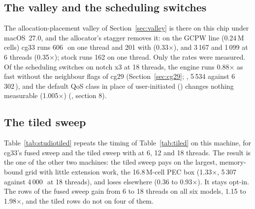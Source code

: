 \subsection*{The valley and the scheduling switches}
The allocation-placement valley of Section~\ref{sec:valley} is there on this chip under macOS~27.0, and the allocator's stagger
removes it: on the GCPW line (0.24\,M cells) cg33 runs 606\,\MC\ on one thread and 201 with 
(0.33$\times$), and 3\,167 and 1\,099 at 6 threads (0.35$\times$); stock runs 162 on one thread. Only the rates were measured. Of the
scheduling switches on notch x3 at 18 threads, the engine runs 0.88$\times$ as fast without the neighbour flags of cg29
(Section~\ref{sec:cg29}; , 5\,534 against 6\,302\,\MC), and the default QoS class in place of
user-initiated () changes nothing measurable (1.005$\times$)
(, section 8).

\subsection*{The tiled sweep}
Table~\ref{tab:studiotiled} repeats the timing of Table~\ref{tab:tiled} on this machine, for cg33's fused sweep and the
tiled sweep with  at 6, 12 and 18 threads. The result is the one of the other two machines: the
tiled sweep pays on the largest, memory-bound grid with little extension work, the 16.8\,M-cell PEC box (1.33$\times$, 5\,307
against 4\,000\,\MC\ at 18 threads), and loses elsewhere (0.36 to 0.93$\times$). It stays opt-in. The rows of the fused sweep gain from
6 to 18 threads on all six models, 1.15 to 1.98$\times$, and the tiled rows do not on four of them.

